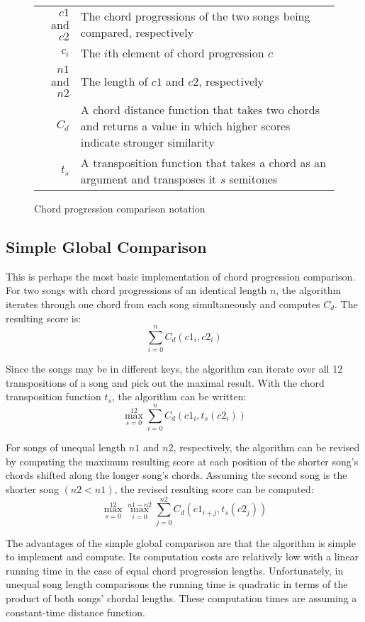 \begin{figure}[h]
\centering
\begin{tabular}{rp{5.5in}}
${c1}$ and ${c2}$   & The chord progressions of the two songs being compared, respectively \\
$c_i$               & The $i$th element of chord progression $c$ \\
${n1}$ and ${n2}$   & The length of ${c1}$ and ${c2}$, respectively \\
$C_d$               & A chord distance function that takes two chords and returns a value in which higher scores indicate stronger similarity  \\
$t_s$               & A transposition function that takes a chord as an argument and transposes it $s$ semitones \\
\end{tabular}
\caption{Chord progression comparison notation}
\label{fig:comparenotation}
\end{figure}

\subsection{Simple Global Comparison}

This is perhaps the most basic implementation of chord progression comparison. For two songs with chord progressions of an identical length $n$, the algorithm iterates through one chord from each song simultaneously and computes $C_d$. The resulting score is: \[ \sum_{i=0}^n C_d({c1}_i, c2_i) \]

Since the songs may be in different keys, the algorithm can iterate over all 12 transpositions of a song and pick out the maximal result. With the chord transposition function $t_s$, the algorithm can be written: \[ \max_{s=0}^{12} \sum_{i=0}^n C_d({c1}_i, t_s({c2}_i)) \]

For songs of unequal length ${n1}$ and ${n2}$, respectively, the algorithm can be revised by computing the maximum resulting score at each position of the shorter song's chords shifted along the longer song's chords. Assuming the second song is the shorter song $({n2} < {n1})$, the revised resulting score can be computed: \[ \max_{s=0}^{12} \max_{i=0}^{{n1} - {n2}} \sum_{j=0}^{n2} C_d({c1}_{i+j}, t_s({c2}_j)) \]

The advantages of the simple global comparison are that the algorithm is simple to implement and compute. Its computation costs are relatively low with a linear running time in the case of equal chord progression lengths. Unfortunately, in unequal song length comparisons the running time is quadratic in terms of the product of both songs' chordal lengths. These computation times are assuming a constant-time distance function.

